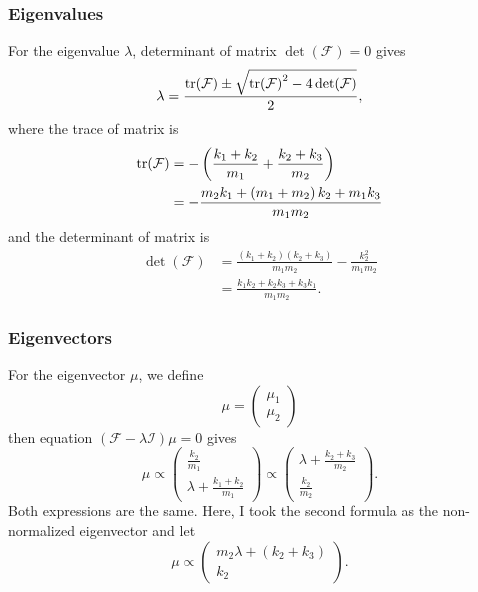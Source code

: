 \documentclass[a4paper, reprint, showkeys, nofootinbib,twoside]{revtex4-1}
\begin{document}
	 \subsubsection{Eigenvalues}\label{subsubsec:Eigencalues}
	 For the eigenvalue $\lambda$, determinant of matrix $\det({\mathcal{F}})=0$ gives
	 \begin{equation}
	 \lambda = \frac{\tr(\mathcal{F}) \pm \sqrt{\tr(\mathcal{F})^2-4\det({\mathcal{F}})}}{2},
	 \end{equation}
	 where the trace of matrix is
	 \begin{equation}
	 \begin{aligned}
	 \tr(\mathcal{F}) &= - \left(\frac{k_1+k_2}{m_1}+\frac{k_2+k_3}{m_2}\right)\\
	 &=-\frac{m_2k_1+\left(m_1+m_2\right)k_2+m_1k_3}{m_1m_2}
	 \end{aligned}
	 \end{equation}
	 and the determinant of matrix is 
	 \begin{equation}
	 \begin{aligned}
	 \det(\mathcal{F}) &= \frac{\left(k_1+k_2\right)\left(k_2+k_3\right)}{m_1m_2}-\frac{k_2^2}{m_1m_2}\\
	 &=\frac{k_1k_2+k_2k_3+k_3k_1}{m_1m_2}.
	 \end{aligned}
	 \end{equation}
	  \subsubsection{Eigenvectors}\label{subsubsec:Eigenvectors}
	  For the eigenvector $\mu$, we define
	  \begin{equation}
	  \mu = \begin{pmatrix}\mu_1\\\mu_2\end{pmatrix}
	  \end{equation}
	  then equation $\left(\mathcal{F}-\lambda\mathcal{I}\right)\mu = 0$ gives 
	   \begin{equation}
	  \mu \propto 
	  	\begin{pmatrix}
	  	\displaystyle  \frac{k_2}{m_1}\\[2ex]\displaystyle \lambda + \frac{k_1+k_2}{m_1}
		\end{pmatrix}
	 \propto 
	  	\begin{pmatrix}
	  	\displaystyle  \lambda+ \frac{k_2+k_3}{m_2}\\[2ex]
		\displaystyle \frac{k_2}{m_2}
		\end{pmatrix}.
	  \end{equation}
	Both expressions are the same. Here, I took the second formula as the non-normalized eigenvector and let
	\begin{equation}
	\mu \propto \begin{pmatrix}
	  	\displaystyle  m_2 \lambda+ \left(k_2+k_3\right)\\
		\displaystyle  k_2
		\end{pmatrix}.
	\end{equation}
\end{document}
